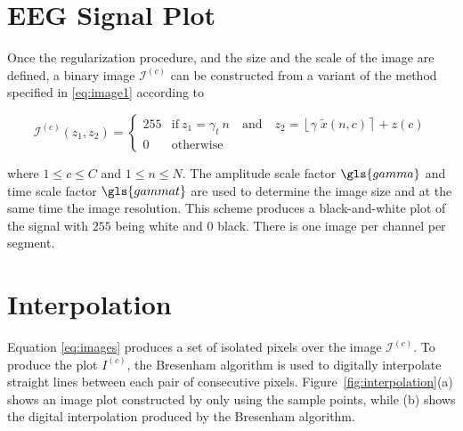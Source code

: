 \section{EEG Signal Plot}
\label{Plot}

Once the regularization procedure, and the size and the scale of the image are defined,  a binary image $\mathcal{I}^{(c)}$ can be constructed from a variant of the method specified in \ref{eq:image1} according to

\begin{equation}
\mathcal{I}^{(c)}(z_1,z_2) = \left\{ \begin{array}{rl}
255 & \text{if} \   z_1 = \gamma_{t} \  n \quad \text{and}  \quad z_2 = \left\lfloor \gamma \; \tilde{x}(n,c) \right\rceil + z(c) \\
0   & \mbox{otherwise}
\end{array}\right.
\label{eq:images}
\end{equation}

\noindent  where  $1 \leq c \leq C$ and $1 \leq n \leq N$. The amplitude scale factor $\gls{gamma}$ and time scale factor $\gls{gammat}$ are used to determine the image size and at the same time the image resolution. This scheme produces a black-and-white plot of the signal with $255$ being white and $0$ black.  There is one image per channel per segment. 


\section{Interpolation}

Equation \ref{eq:images} produces a set of isolated pixels over the image $\mathcal{I}^{(c)}$.  To produce the plot $I^{(c)}$, the Bresenham \cite{Bresenham1965,Ramele2016} algorithm is used to digitally interpolate straight lines between each pair of consecutive pixels.  Figure~\ref{fig:interpolation}(a) shows an image plot constructed by only using the sample points, while (b) shows the digital interpolation produced by the Bresenham algorithm.

